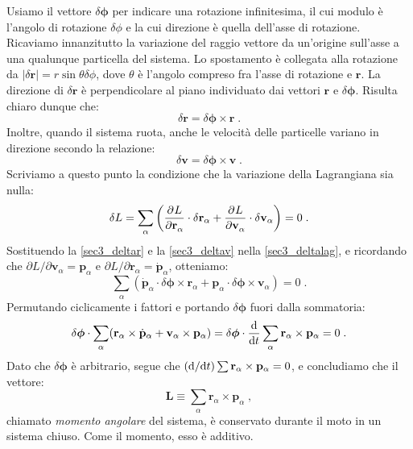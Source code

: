 Usiamo il vettore $\delta\boldsymbol{\phi}$ per indicare una rotazione infinitesima, il cui modulo è l'angolo di rotazione $\delta\phi$ e la cui direzione è quella dell'asse di rotazione. Ricaviamo innanzitutto la variazione del raggio vettore da un'origine sull'asse a una qualunque particella del sistema. Lo spostamento è collegata alla rotazione da $|\delta\mathbf{r}|=r\sin\theta\delta\phi$, dove $\theta$ è l'angolo compreso fra l'asse di rotazione e $\mathbf{r}$. La direzione di $\delta\mathbf{r}$ è perpendicolare al piano individuato dai vettori $\mathbf{r}$ e $\delta\boldsymbol{\phi}$. Risulta chiaro dunque che:
\begin{equation}
\delta\mathbf{r}=\delta\boldsymbol{\phi}\times\mathbf{r}\;. \label{sec3_deltar}
\end{equation}
Inoltre, quando il sistema ruota, anche le velocità delle particelle variano in direzione secondo la relazione:
\begin{equation}
\delta\mathbf{v}=\delta\boldsymbol{\phi}\times \mathbf{v}\;. \label{sec3_deltav}
\end{equation}
Scriviamo a questo punto la condizione che la variazione della Lagrangiana sia nulla:
\begin{equation}
\delta L =\sum_{\alpha}\left(\pdev{L}{\mathbf{r}_{\alpha}}\cdot\delta\mathbf{r}_{\alpha}+\pdev{L}{\mathbf{v}_{\alpha}}\cdot\delta\mathbf{v}_{\alpha}\right)=0\;. \label{sec3_deltalag}
\end{equation}
Sostituendo la \eqref{sec3_deltar} e la \eqref{sec3_deltav} nella \eqref{sec3_deltalag}, e ricordando che $\partial L/\partial\mathbf{v}_{\alpha}=\mathbf{p}_{\alpha}$ e $\partial L/\partial\mathbf{r}_{\alpha} =\dot{\mathbf{p}}_{\alpha}$, otteniamo:
\begin{equation}
\sum_{\alpha}(\dot{\mathbf{p}}_{\alpha}\cdot\delta\boldsymbol{\phi}\times\mathbf{r}_{\alpha} + \mathbf{p}_{\alpha}\cdot\delta\boldsymbol{\phi}\times\mathbf{v}_{\alpha})=0\;.
\end{equation}
Permutando ciclicamente i fattori e portando $\delta\boldsymbol{\phi}$ fuori dalla sommatoria:
\begin{equation}
\delta\boldsymbol{\phi}\cdot\sum_{\alpha}(\mathbf{r}_{\alpha}\times\dot{\mathbf{p}}_{\alpha}+\mathbf{v}_{\alpha}\times\mathbf{p}_{\alpha})= \delta\boldsymbol{\phi}\cdot\frac{\diff}{\diff[t]}\sum_{\alpha}\mathbf{r}_{\alpha}\times\mathbf{p}_{\alpha}=0\;.
\end{equation}
Dato che $\delta\boldsymbol{\phi}$ è arbitrario, segue che $(\diff/\diff[t])\sum\mathbf{r}_{\alpha}\times\mathbf{p}_{\alpha}=0$, e concludiamo che il vettore:
\begin{equation}
\mathbf{L}\equiv \sum_{\alpha}\mathbf{r}_{\alpha}\times\mathbf{p}_{\alpha}\;,
\end{equation}
chiamato \textit{momento angolare} del sistema, è conservato durante il moto in un sistema chiuso. Come il momento, esso è additivo.
\pagebreak

